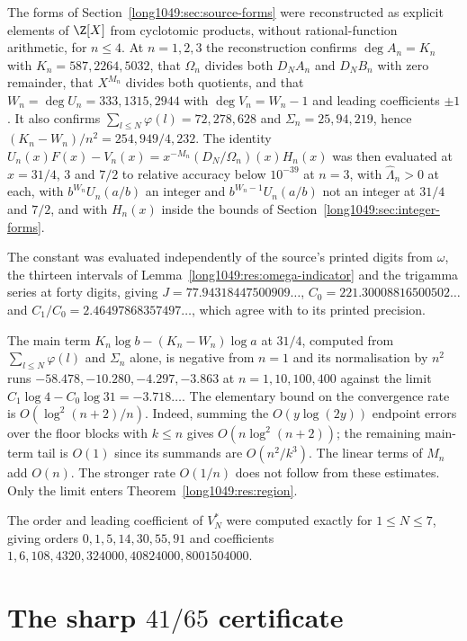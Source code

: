 \documentclass[11pt]{article}
\begin{document}
The forms of Section~\ref{long1049:sec:source-forms} were reconstructed as explicit
elements of $\Z[X]$ from cyclotomic products, without rational-function
arithmetic, for $n\le4$.  At $n=1,2,3$ the reconstruction confirms
$\deg A_n=K_n$ with $K_n=587,2264,5032$, that $\Omega_n$ divides both $D_NA_n$
and $D_NB_n$ with zero remainder, that $X^{M_n}$ divides both quotients, and
that $W_n=\deg U_n=333,1315,2944$ with $\deg V_n=W_n-1$ and leading
coefficients $\pm1$.  It also confirms
$\sum_{l\le N}\varphi(l)=72,278,628$ and $\Sigma_n=25,94,219$, hence
$(K_n-W_n)/n^{2}=254,949/4,232$.  The identity
$U_n(x)F(x)-V_n(x)=x^{-M_n}(D_N/\Omega_n)(x)H_n(x)$ was then evaluated at
$x=31/4$, $3$ and $7/2$ to relative accuracy below $10^{-39}$ at $n=3$, with
$\widehat\Lambda_n>0$ at each, with $b^{W_n}U_n(a/b)$ an integer and
$b^{W_n-1}U_n(a/b)$ not an integer at $31/4$ and $7/2$, and with $H_n(x)$
inside the bounds of Section~\ref{long1049:sec:integer-forms}.

The constant was evaluated independently of the source's printed digits from
$\omega$, the thirteen intervals of Lemma~\ref{long1049:res:omega-indicator} and the
trigamma series at forty digits, giving
$J=77.94318447500909\ldots$, $C_0=221.30008816500502\ldots$ and
$C_1/C_0=2.46497868357497\ldots$, which agree with
\cite[p.~162]{zudilin2004} to its printed precision.

The main term $K_n\log b-(K_n-W_n)\log a$ at $31/4$, computed from
$\sum_{l\le N}\varphi(l)$ and $\Sigma_n$ alone, is negative from $n=1$ and its
normalisation by $n^{2}$ runs $-58.478,-10.280,-4.297,-3.863$ at
$n=1,10,100,400$ against the limit $C_1\log4-C_0\log31=-3.718\ldots$.  The
elementary bound on the convergence rate is $O(\log^2(n+2)/n)$.
Indeed, summing the $O(y\log(2y))$ endpoint errors over the floor blocks
with $k\le n$ gives $O(n\log^2(n+2))$; the remaining main-term tail is
$O(1)$ since its summands are $O(n^2/k^3)$.  The linear terms of $M_n$
add $O(n)$.  The stronger rate $O(1/n)$ does not follow from these estimates.  Only the limit enters Theorem~\ref{long1049:res:region}.

The order and leading coefficient of $V_N^{*}$ were computed exactly for
$1\le N\le7$, giving orders $0,1,5,14,30,55,91$ and coefficients
$1,6,108,4320,324000,40824000,8001504000$.

\section{The sharp $41/65$ certificate}\label{long1049:sec:sharp}
\end{document}
